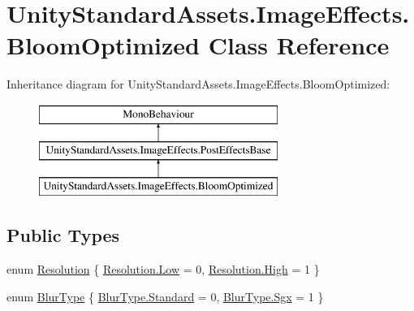 \hypertarget{class_unity_standard_assets_1_1_image_effects_1_1_bloom_optimized}{}\section{Unity\+Standard\+Assets.\+Image\+Effects.\+Bloom\+Optimized Class Reference}
\label{class_unity_standard_assets_1_1_image_effects_1_1_bloom_optimized}
Inheritance diagram for Unity\+Standard\+Assets.\+Image\+Effects.\+Bloom\+Optimized\+:\begin{figure}[H]
\begin{center}
\leavevmode
\includegraphics[height=3.000000cm]{class_unity_standard_assets_1_1_image_effects_1_1_bloom_optimized}
\end{center}
\end{figure}
\subsection*{Public Types}
\begin{DoxyCompactItemize}
\item 
enum \mbox{\hyperlink{class_unity_standard_assets_1_1_image_effects_1_1_bloom_optimized_ab937d5a1d6ab55f891d5a0ada3ffed8f}{Resolution}} \{ \mbox{\hyperlink{class_unity_standard_assets_1_1_image_effects_1_1_bloom_optimized_ab937d5a1d6ab55f891d5a0ada3ffed8fa28d0edd045e05cf5af64e35ae0c4c6ef}{Resolution.\+Low}} = 0, 
\mbox{\hyperlink{class_unity_standard_assets_1_1_image_effects_1_1_bloom_optimized_ab937d5a1d6ab55f891d5a0ada3ffed8fa655d20c1ca69519ca647684edbb2db35}{Resolution.\+High}} = 1
 \}
\item 
enum \mbox{\hyperlink{class_unity_standard_assets_1_1_image_effects_1_1_bloom_optimized_a79317d54ae2cad9590852d264ebeabbf}{Blur\+Type}} \{ \mbox{\hyperlink{class_unity_standard_assets_1_1_image_effects_1_1_bloom_optimized_a79317d54ae2cad9590852d264ebeabbfaeb6d8ae6f20283755b339c0dc273988b}{Blur\+Type.\+Standard}} = 0, 
\mbox{\hyperlink{class_unity_standard_assets_1_1_image_effects_1_1_bloom_optimized_a79317d54ae2cad9590852d264ebeabbfa801ee3a16d40fe81e3f99291f4fd4949}{Blur\+Type.\+Sgx}} = 1
 \}
\end{DoxyCompactItemize}
